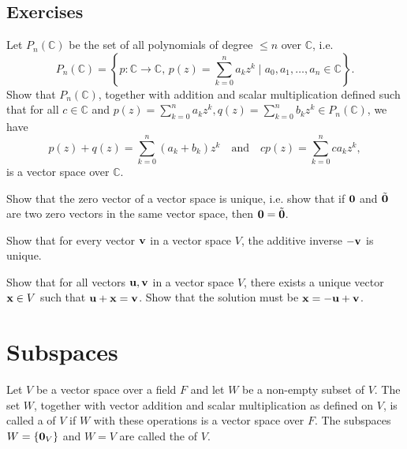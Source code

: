 \subsection*{Exercises}

\begin{problem}\label{prb:pnvs}
Let $ P_n(\mathbb{C}) $ be the set of all polynomials of degree $ \leq n $ over $ \mathbb{C} $, i.e.
\begin{equation*}
    P_n(\mathbb{C})=\left\{p:\mathbb{C}\to\mathbb{C},\,p(z)=\sum_{k=0}^n a_k z^k\mid a_0,a_1,\ldots,a_n\in \mathbb{C}\right\}.
\end{equation*}
Show that $ P_n(\mathbb{C}) $, together with addition and scalar multiplication defined such that for all $ c\in\mathbb{C} $ and $ p(z)=\sum_{k=0}^n a_k z^k,q(z)=\sum_{k=0}^n b_k z^k\in P_n(\mathbb{C}) $, we have
\begin{equation*}
    p(z)+q(z)=\sum_{k=0}^n (a_k+b_k)z^k \quad\text{and}\quad cp(z)=\sum_{k=0}^n ca_k z^k,
\end{equation*}
is a vector space over $ \mathbb{C} $.
\end{problem}

\begin{problem}\label{prb:0unique}
Show that the zero vector of a vector space is unique, i.e. show that if $ \mathbf{0} $ and $ \tilde{\mathbf{0}} $ are two zero vectors in the same vector space, then $ \mathbf{0}=\tilde{\mathbf{0}} $.
\end{problem}

\begin{problem}
Show that for every vector $ \mathbf{v} $ in a vector space $ V $, the additive inverse $ -\mathbf{v} $ is unique.
\end{problem}

\begin{problem}
Show that for all vectors $ \mathbf{u},\mathbf{v} $ in a vector space $ V $, there exists a unique vector $ \mathbf{x}\in V $ such that $ \mathbf{u}+\mathbf{x}=\mathbf{v} $. Show that the solution must be $ \mathbf{x}=-\mathbf{u}+\mathbf{v} $.
\end{problem}

\section{Subspaces}

\begin{definition}
Let $ V $ be a vector space over a field $ F $ and let $ W $ be a non-empty subset of $ V $. The set $ W $, together with vector addition and scalar multiplication as defined on $ V $, is called a  of $ V $ if $ W $ with these operations is a vector space over $ F $. The subspaces $ W=\{\mathbf{0}_V\} $ and $ W=V $ are called the  of $ V $.
\end{definition}

